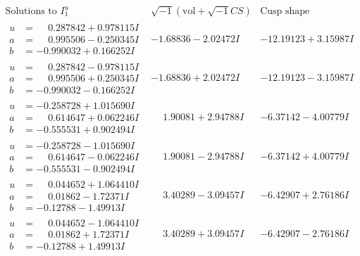 \documentclass[1p]{elsarticle_modified}
\theoremstyle{definition}
\newcommand{\I}{\sqrt{-1}}
\begin{document}
$$\begin{array}{c|c|c}  
\text{Solutions to }I^u_{1}& \I (\text{vol} + \sqrt{-1}CS) & \text{Cusp shape}\\
 \hline 
\begin{aligned}
u &= \phantom{-}0.287842 + 0.978115 I \\
a &= \phantom{-}0.995506 - 0.250345 I \\
b &= -0.990032 + 0.166252 I\end{aligned}
 & -1.68836 - 2.02472 I & -12.19123 + 3.15987 I \\ \hline\begin{aligned}
u &= \phantom{-}0.287842 - 0.978115 I \\
a &= \phantom{-}0.995506 + 0.250345 I \\
b &= -0.990032 - 0.166252 I\end{aligned}
 & -1.68836 + 2.02472 I & -12.19123 - 3.15987 I \\ \hline\begin{aligned}
u &= -0.258728 + 1.015690 I \\
a &= \phantom{-}0.614647 + 0.062246 I \\
b &= -0.555531 + 0.902494 I\end{aligned}
 & \phantom{-}1.90081 + 2.94788 I & -6.37142 - 4.00779 I \\ \hline\begin{aligned}
u &= -0.258728 - 1.015690 I \\
a &= \phantom{-}0.614647 - 0.062246 I \\
b &= -0.555531 - 0.902494 I\end{aligned}
 & \phantom{-}1.90081 - 2.94788 I & -6.37142 + 4.00779 I \\ \hline\begin{aligned}
u &= \phantom{-}0.044652 + 1.064410 I \\
a &= \phantom{-}0.01862 - 1.72371 I \\
b &= -0.12788 - 1.49913 I\end{aligned}
 & \phantom{-}3.40289 - 3.09457 I & -6.42907 + 2.76186 I \\ \hline\begin{aligned}
u &= \phantom{-}0.044652 - 1.064410 I \\
a &= \phantom{-}0.01862 + 1.72371 I \\
b &= -0.12788 + 1.49913 I\end{aligned}
 & \phantom{-}3.40289 + 3.09457 I & -6.42907 - 2.76186 I \\ \hline\begin{aligned}

\end{aligned}
\end{array}$$
\end{document}
